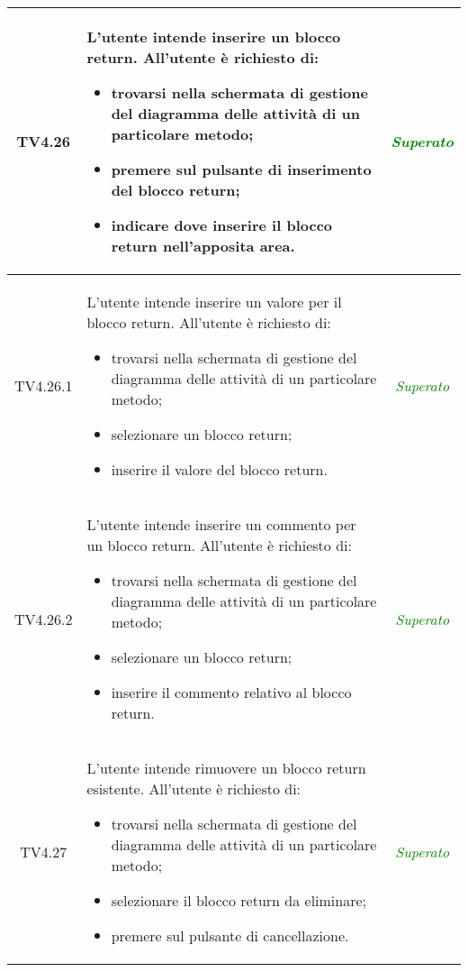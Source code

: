 \begin{longtable}{|c|>{}m{8cm}|c|}
\hypertarget{TV4.26}{TV4.26} & L'utente intende inserire un blocco return.
All'utente è richiesto di:
\begin{itemize}
	\item trovarsi nella schermata di gestione del diagramma delle attività di un particolare metodo;
	\item premere sul pulsante di inserimento del blocco return;
	\item indicare dove inserire il blocco return nell'apposita area.
\end{itemize} & \textcolor{Green}{\textit{Superato}}\\ \hline

\hypertarget{TV4.26.1}{TV4.26.1} & L'utente intende inserire un valore per il blocco return.
All'utente è richiesto di:
\begin{itemize}
	\item trovarsi nella schermata di gestione del diagramma delle attività di un particolare metodo;
	\item selezionare un blocco return;
	\item inserire il valore del blocco return.
\end{itemize} & \textcolor{Green}{\textit{Superato}}\\ \hline

\hypertarget{TV4.26.2}{TV4.26.2} & L'utente intende inserire un commento per un blocco return.
All'utente è richiesto di:
\begin{itemize}
	\item trovarsi nella schermata di gestione del diagramma delle attività di un particolare metodo;
	\item selezionare un blocco return;
	\item inserire il commento relativo al blocco return.
\end{itemize} & \textcolor{Green}{\textit{Superato}}\\ \hline

\hypertarget{TV4.27}{TV4.27} & L'utente intende rimuovere un blocco return esistente.
All'utente è richiesto di:
\begin{itemize}
	\item trovarsi nella schermata di gestione del diagramma delle attività di un particolare metodo;
	\item selezionare il blocco return da eliminare;
	\item premere sul pulsante di cancellazione.
\end{itemize} & \textcolor{Green}{\textit{Superato}}\\ \hline


\end{longtable}
